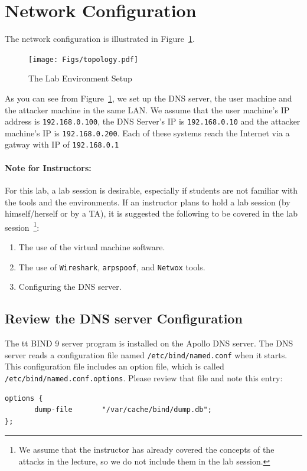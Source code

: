 \section{Network Configuration}
The network configuration is illustrated in 
Figure~\ref{fig:dns:environment}. 

\begin{figure}[!htb]
\centering
\texttt{[image: Figs/topology.pdf]}
\caption{The Lab Environment Setup} 
\label{fig:dns:environment}
\end{figure}


As you can see from Figure~\ref{fig:dns:environment}, 
we set up the DNS server, the user machine and the attacker machine in the same LAN.
We assume that the user machine's IP address is {\tt 192.168.0.100}, the DNS 
Server's IP is {\tt 192.168.0.10} and the attacker machine's IP is {\tt 192.168.0.200}.
Each of these systems reach the Internet via a gatway with IP of {\tt 192.168.0.1}

\paragraph {Note for Instructors:} 
For this lab, a lab session is desirable, especially if students are
not familiar with the tools and the environments. If an instructor
plans to hold a lab session (by himself/herself or by a TA), it
is suggested the following to be covered in the
lab session~\footnote{We assume that the instructor has already covered
the concepts of the attacks in the lecture, so we do not include
them in the lab session.}:
\begin{enumerate}
  \item The use of the virtual machine software. 

  \item The use of {\tt Wireshark}, {\tt arpspoof}, and {\tt Netwox} tools.

  \item Configuring the DNS server.
\end{enumerate}

\subsection{Review the DNS server Configuration} 

The {tt BIND 9} server program is installed on the Apollo DNS server\cite{bib3}.
The DNS server reads a configuration file named
{\tt /etc/bind/named.conf} when it starts. This configuration file includes an option 
file, which is called {\tt /etc/bind/named.conf.options}.  Please 
review that file and note this entry:
\begin{verbatim}
options {
       dump-file       "/var/cache/bind/dump.db";
};
\end{verbatim}

